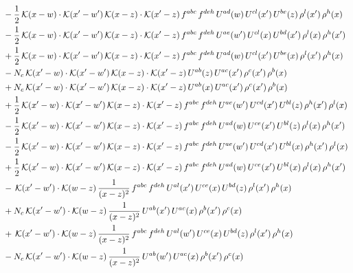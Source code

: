 \documentclass[9pt]{article}
\numberwithin{equation}{section}
\begin{document}
\begin{align}
&-\frac{1}{2}\,\mathcal{K}(x-w)\cdot\mathcal{K}(x'-w')\,\mathcal{K}(x-z)\cdot\mathcal{K}(x'-z)\,f^{abc}\,f^{deh}\,U^{ad}(w)\,U^{cl}(x')\,U^{be}(z)\,\rho^{l}(x')\,\rho^{h}(x)\notag\\
&-\frac{1}{2}\,\mathcal{K}(x-w)\cdot\mathcal{K}(x'-w')\,\mathcal{K}(x-z)\cdot\mathcal{K}(x'-z)\,f^{abc}\,f^{deh}\,U^{ae}(w')\,U^{cl}(x)\,U^{bd}(x')\,\rho^{l}(x)\,\rho^{h}(x')\notag\\
&+\frac{1}{2}\,\mathcal{K}(x-w)\cdot\mathcal{K}(x'-w')\,\mathcal{K}(x-z)\cdot\mathcal{K}(x'-z)\,f^{abc}\,f^{deh}\,U^{ad}(w)\,U^{cl}(x')\,U^{be}(x)\,\rho^{l}(x')\,\rho^{h}(x)\notag\\
&-N_{c}\,\mathcal{K}(x'-w)\cdot\mathcal{K}(x'-w')\,\mathcal{K}(x-z)\cdot\mathcal{K}(x'-z)\,U^{ab}(z)\,U^{ac}(x')\,\rho^{c}(x')\,\rho^{b}(x)\notag\\
&+N_{c}\,\mathcal{K}(x'-w)\cdot\mathcal{K}(x'-w')\,\mathcal{K}(x-z)\cdot\mathcal{K}(x'-z)\,U^{ab}(x)\,U^{ac}(x')\,\rho^{c}(x')\,\rho^{b}(x)\notag\\
&+\frac{1}{2}\,\mathcal{K}(x'-w)\cdot\mathcal{K}(x'-w')\,\mathcal{K}(x-z)\cdot\mathcal{K}(x'-z)\,f^{abc}\,f^{deh}\,U^{ae}(w')\,U^{cd}(x')\,U^{bl}(z)\,\rho^{h}(x')\,\rho^{l}(x)\notag\\
&-\frac{1}{2}\,\mathcal{K}(x'-w)\cdot\mathcal{K}(x'-w')\,\mathcal{K}(x-z)\cdot\mathcal{K}(x'-z)\,f^{abc}\,f^{deh}\,U^{ad}(w)\,U^{ce}(x')\,U^{bl}(z)\,\rho^{l}(x)\,\rho^{h}(x')\notag\\
&-\frac{1}{2}\,\mathcal{K}(x'-w)\cdot\mathcal{K}(x'-w')\,\mathcal{K}(x-z)\cdot\mathcal{K}(x'-z)\,f^{abc}\,f^{deh}\,U^{ae}(w')\,U^{cd}(x')\,U^{bl}(x)\,\rho^{h}(x')\,\rho^{l}(x)\notag\\
&+\frac{1}{2}\,\mathcal{K}(x'-w)\cdot\mathcal{K}(x'-w')\,\mathcal{K}(x-z)\cdot\mathcal{K}(x'-z)\,f^{abc}\,f^{deh}\,U^{ad}(w)\,U^{ce}(x')\,U^{bl}(x)\,\rho^{l}(x)\,\rho^{h}(x')\notag\\
&-\,\mathcal{K}(x'-w')\cdot\mathcal{K}(w-z)\,\frac{1}{(x-z)^{2}}\,f^{abc}\,f^{deh}\,U^{al}(x')\,U^{ce}(x)\,U^{bd}(z)\,\rho^{l}(x')\,\rho^{h}(x)\notag\\
&+N_{c}\,\mathcal{K}(x'-w')\cdot\mathcal{K}(w-z)\,\frac{1}{(x-z)^{2}}\,U^{ab}(x')\,U^{ac}(x)\,\rho^{b}(x')\,\rho^{c}(x)\notag\\
&+\,\mathcal{K}(x'-w')\cdot\mathcal{K}(w-z)\,\frac{1}{(x-z)^{2}}\,f^{abc}\,f^{deh}\,U^{al}(w')\,U^{ce}(x)\,U^{bd}(z)\,\rho^{l}(x')\,\rho^{h}(x)\notag\\
&-N_{c}\,\mathcal{K}(x'-w')\cdot\mathcal{K}(w-z)\,\frac{1}{(x-z)^{2}}\,U^{ab}(w')\,U^{ac}(x)\,\rho^{b}(x')\,\rho^{c}(x)\notag\\

\end{align}
\end{document}
